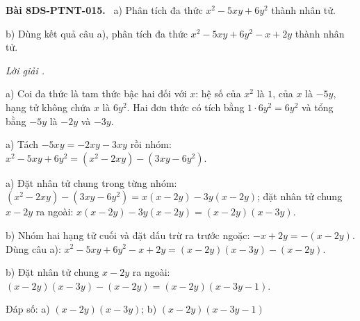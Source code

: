 \documentclass[12pt,a4paper]{article}
\newenvironment{problem}[1][]{\par\medskip\noindent\textbf{Bài #1.}\ }{\par}
\newenvironment{solution}[1][]{\par\noindent\textit{Lời giải #1.}\par}{\par}
\begin{document}
\begin{problem}[8DS-PTNT-015]
a) Phân tích đa thức $x^2 - 5xy + 6y^2$ thành nhân tử.

b) Dùng kết quả câu a), phân tích đa thức $x^2 - 5xy + 6y^2 - x + 2y$ thành nhân tử.

\begin{solution}
a) Coi đa thức là tam thức bậc hai đối với $x$: hệ số của $x^2$ là $1$, của $x$ là $-5y$, hạng tử không chứa $x$ là $6y^2$. Hai đơn thức có tích bằng $1 \cdot 6y^2 = 6y^2$ và tổng bằng $-5y$ là $-2y$ và $-3y$.

a) Tách $-5xy = -2xy - 3xy$ rồi nhóm: $x^2 - 5xy + 6y^2 = (x^2 - 2xy) - (3xy - 6y^2)$.

a) Đặt nhân tử chung trong từng nhóm: $(x^2 - 2xy) - (3xy - 6y^2) = x(x - 2y) - 3y(x - 2y)$; đặt nhân tử chung $x - 2y$ ra ngoài: $x(x - 2y) - 3y(x - 2y) = (x - 2y)(x - 3y)$.

b) Nhóm hai hạng tử cuối và đặt dấu trừ ra trước ngoặc: $-x + 2y = -(x - 2y)$. Dùng câu a): $x^2 - 5xy + 6y^2 - x + 2y = (x - 2y)(x - 3y) - (x - 2y)$.

b) Đặt nhân tử chung $x - 2y$ ra ngoài: $(x - 2y)(x - 3y) - (x - 2y) = (x - 2y)(x - 3y - 1)$.

Đáp số: a) $\boxed{(x - 2y)(x - 3y)}$; b) $\boxed{(x - 2y)(x - 3y - 1)}$
\end{solution}
\end{problem}
\end{document}
